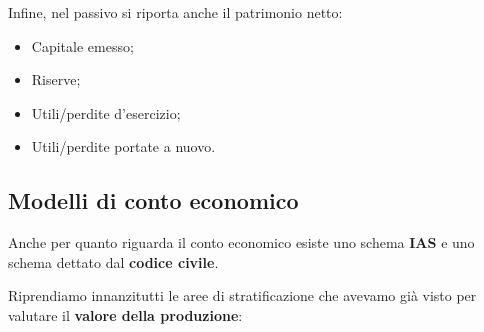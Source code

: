 \documentclass[a4paper,11pt]{article}
\begin{document}
Infine, nel passivo si riporta anche il patrimonio netto:
\begin{itemize}
	\item Capitale emesso;
	\item Riserve;
	\item Utili/perdite d'esercizio;
	\item Utili/perdite portate a nuovo.
\end{itemize}

\subsection{Modelli di conto economico}
Anche per quanto riguarda il conto economico esiste uno schema \textbf{IAS} e uno schema dettato dal \textbf{codice civile}. 

Riprendiamo innanzitutti le aree di stratificazione che avevamo già visto per valutare il \textbf{valore della produzione}:
\end{document}
